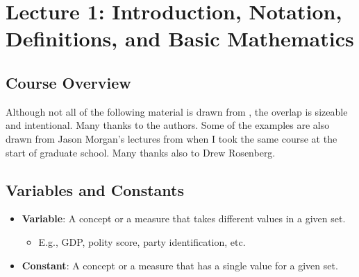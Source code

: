 \section{Lecture 1: Introduction, Notation, Definitions, and Basic Mathematics}

\subsection{Course Overview}

Although not all of the following material is drawn from \citet{moore2013mathematics}, the overlap is sizeable and intentional. Many thanks to the authors. Some of the examples are also drawn from Jason Morgan's lectures from when I took the same course at the start of graduate school. Many thanks also to Drew Rosenberg.

\onehalfspacing

\subsection{Variables and Constants}

\begin{itemize}
    \item \textbf{Variable}: A concept or a measure that takes different values in a given set.
    \begin{itemize}
        \item E.g., GDP, polity score, party identification, etc.
    \end{itemize}
    \item \textbf{Constant}: A concept or a measure that has a single value for a given set.
\end{itemize}

